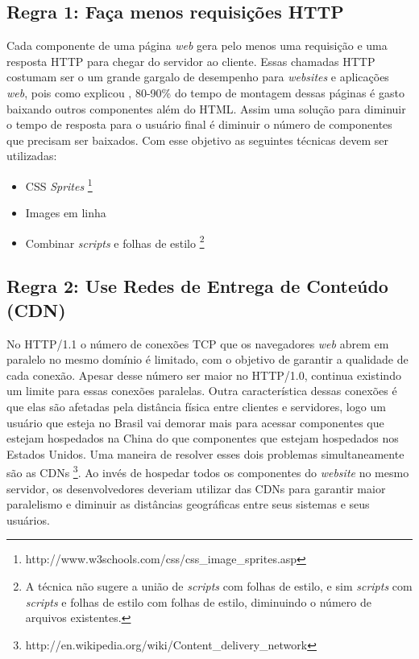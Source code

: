 \subsection{Regra 1: Faça menos requisições HTTP}
\label{subsec:highperformance_regra1}
Cada componente de uma página \textit{web} gera pelo menos uma requisição e uma resposta HTTP para chegar do servidor ao cliente. Essas chamadas HTTP costumam ser o um grande gargalo de desempenho para \textit{websites} e aplicações \textit{web}, pois como explicou , 80-90\% do tempo de montagem dessas páginas é gasto baixando outros componentes além do HTML. Assim uma solução para diminuir o tempo de resposta para o usuário final é diminuir o número de componentes que precisam ser baixados. Com esse objetivo as seguintes técnicas devem ser utilizadas:
	\begin{itemize}
		\item CSS \textit{Sprites} \footnote{http://www.w3schools.com/css/css\_image\_sprites.asp}
		\item Images em linha
		\item Combinar \textit{scripts} e folhas de estilo \footnote{A técnica não sugere a união de \textit{scripts} com folhas de estilo, e sim \textit{scripts} com \textit{scripts} e folhas de estilo com folhas de estilo, diminuindo o número de arquivos existentes.}
	\end{itemize}

\subsection{Regra 2: Use Redes de Entrega de Conteúdo (CDN)}
\label{subsec:highperformance_regra2}
No HTTP/1.1 o número de conexões TCP que os navegadores \textit{web} abrem em paralelo no mesmo domínio é limitado, com o objetivo de garantir a qualidade de cada conexão. Apesar desse número ser maior no HTTP/1.0, continua existindo um limite para essas conexões paralelas. Outra característica dessas conexões é que elas são afetadas pela distância física entre clientes e servidores, logo um usuário que esteja no Brasil vai demorar mais para acessar componentes que estejam hospedados na China do que componentes que estejam hospedados nos Estados Unidos. Uma maneira de resolver esses dois problemas simultaneamente são as CDNs \footnote{http://en.wikipedia.org/wiki/Content\_delivery\_network}. Ao invés de hospedar todos os componentes do \textit{website} no mesmo servidor, os desenvolvedores deveriam utilizar das CDNs para garantir maior paralelismo e diminuir as distâncias geográficas entre seus sistemas e seus usuários.

